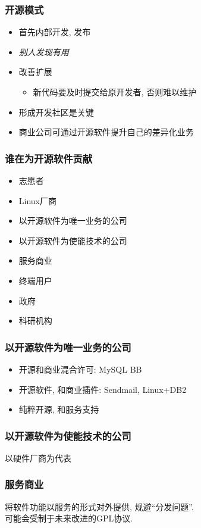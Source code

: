 \documentclass{beamer}
\begin{document}
\begin{frame}
	\frametitle{开源模式}
	\begin{itemize}
		\item 首先内部开发, 发布
		\item \emph{别人发现有用}
		\item 改善扩展
			\begin{itemize}
				\item 新代码要及时提交给原开发者, 否则难以维护
			\end{itemize}
		\item 形成开发社区是关键
		\item 商业公司可通过开源软件提升自己的差异化业务
	\end{itemize}
\end{frame}

\begin{frame}
	\frametitle{谁在为开源软件贡献}
	\begin{itemize}
		\item 志愿者
		\item Linux厂商
		\item 以开源软件为唯一业务的公司
		\item 以开源软件为使能技术的公司
		\item 服务商业
		\item 终端用户
		\item 政府
		\item 科研机构
	\end{itemize}
\end{frame}

\begin{frame}
	\frametitle{ 以开源软件为唯一业务的公司 }

	\begin{itemize}
		\item 开源和商业混合许可: MySQL BB
		\item 开源软件, 和商业插件: Sendmail, Linux+DB2
		\item 纯粹开源, 和服务支持
	\end{itemize}
\end{frame}

\begin{frame}
	\frametitle{以开源软件为使能技术的公司}
	以硬件厂商为代表
\end{frame}

\begin{frame}
	\frametitle{服务商业}
	将软件功能以服务的形式对外提供, 规避``分发问题''. \\
	可能会受制于未来改进的GPL协议.
\end{frame}
\end{document}
